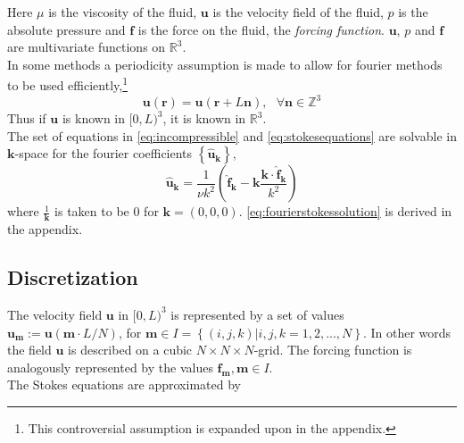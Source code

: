 \documentclass[a4paper,
twoside=false,abstract=false,numbers=noenddot,
titlepage=false,headings=small,parskip=half,version=last]{scrartcl}
\begin{document}
Here $\mu$ is the viscosity of the fluid, $\mathbf{u}$ is the velocity field of the fluid, $p$ is the absolute pressure and $\mathbf{f}$ is the force on the fluid, the \emph{forcing function}. $\mathbf{u}$, $p$ and $\mathbf{f}$ are multivariate functions on $\mathbb{R}^3$.\\

In some methods a periodicity assumption is made to allow for fourier methods to be used efficiently,\footnote{This controversial assumption is expanded upon in the appendix.}
\begin{equation}
\mathbf{u}(\mathbf{r}) = \mathbf{u}(\mathbf{r}+L\mathbf{n}),\text{ }\forall \mathbf{n} \in \mathbb{Z}^3
\end{equation}
Thus if $\mathbf{u}$ is known in $[0,L)^3$, it is known in $\mathbb{R}^3$.\\
The set of equations in \eqref{eq:incompressible} and \eqref{eq:stokesequations} are solvable in $\mathbf{k}$-space for the fourier coefficients $\left\{\hat{\mathbf{u}}_\mathbf{k}\right\}$,
\begin{equation}
\hat{\mathbf{u}}_\mathbf{k} = \frac{1}{\nu k^2} \left( \hat{\mathbf{f}}_\mathbf{k} - \mathbf{k} \frac{\mathbf{k}\cdot \hat{\mathbf{f}}_\mathbf{k}}{k^2} \right) \label{eq:fourierstokessolution}
\end{equation}
where $\frac{1}{\mathbf{k}}$ is taken to be $0$ for $\mathbf{k}=(0,0,0)$. \eqref{eq:fourierstokessolution} is derived in the appendix.
\subsection{Discretization}
The velocity field $\mathbf{u}$ in $[0,L)^3$ is represented by a set of values $\mathbf{u}_\mathbf{m}:=\mathbf{u}(\mathbf{m}\cdot L/N)$, for $\mathbf{m}\in I = \left\{(i,j,k) | i,j,k=1,2,...,N\right\}$.
In other words the field $\mathbf{u}$ is described on a cubic $N\times N\times N$-grid.
The forcing function is analogously represented by the values $\mathbf{f}_\mathbf{m}, \mathbf{m}\in I$.\\
The Stokes equations are approximated by 
\end{document}

